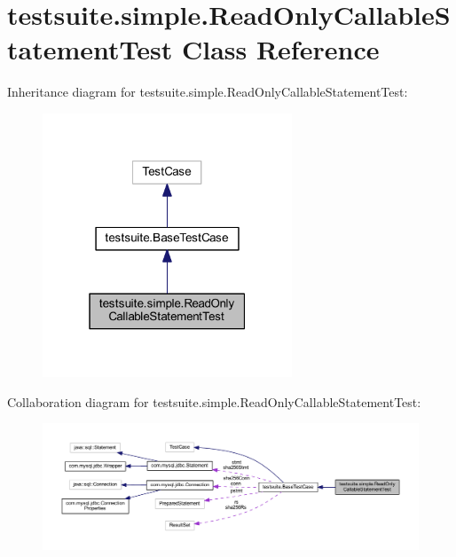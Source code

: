 \hypertarget{classtestsuite_1_1simple_1_1_read_only_callable_statement_test}{}\section{testsuite.\+simple.\+Read\+Only\+Callable\+Statement\+Test Class Reference}
\label{classtestsuite_1_1simple_1_1_read_only_callable_statement_test}


Inheritance diagram for testsuite.\+simple.\+Read\+Only\+Callable\+Statement\+Test\+:
\nopagebreak
\begin{figure}[H]
\begin{center}
\leavevmode
\includegraphics[width=211pt]{classtestsuite_1_1simple_1_1_read_only_callable_statement_test__inherit__graph}
\end{center}
\end{figure}


Collaboration diagram for testsuite.\+simple.\+Read\+Only\+Callable\+Statement\+Test\+:
\nopagebreak
\begin{figure}[H]
\begin{center}
\leavevmode
\includegraphics[width=350pt]{classtestsuite_1_1simple_1_1_read_only_callable_statement_test__coll__graph}
\end{center}
\end{figure}
